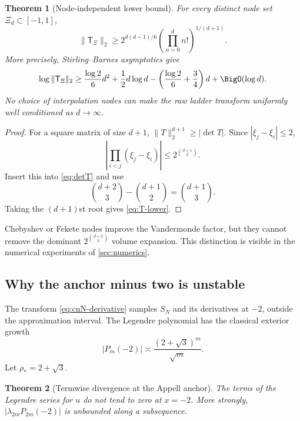 \documentclass[11pt,oneside]{article}
\newtheorem{theorem}{Theorem}[section]
\theoremstyle{definition}
\theoremstyle{remark}
\newcommand{\rhozero}{\rho_{\!*}}
\begin{document}
\begin{theorem}[Node-independent lower bound]
\label{thm:node-independent-instability}
For every distinct node set $\Xi_d\subset[-1,1]$,
\begin{equation}
 \|\mathsf T_\Xi\|_2
 \ge
 2^{d(d-1)/6}
 \left(\prod_{n=0}^{d}n!\right)^{1/(d+1)}.
 \label{eq:T-lower}
\end{equation}
More precisely, Stirling--Barnes asymptotics give
\begin{equation}
 \log\|\mathsf T_\Xi\|_2
 \ge \frac{\log2}{6}d^2+\frac12d\log d
 -\left(\frac{\log2}{6}+\frac34\right)d+\BigO(\log d).
 \label{eq:T-lower-asymptotic}
\end{equation}
No choice of interpolation nodes can make the raw ladder transform uniformly
well conditioned as $d\to\infty$.
\end{theorem}

\begin{proof}
For a square matrix of size $d+1$,
$\|T\|_2^{d+1}\ge|\det T|$.  Since
$|\xi_j-\xi_i|\le2$,
\[
 \left|\prod_{i<j}(\xi_j-\xi_i)\right|
 \le2^{\binom{d+1}{2}}.
\]
Insert this into \eqref{eq:detT} and use
\[
 \binom{d+2}{3}-\binom{d+1}{2}=\binom{d+1}{3}.
\]
Taking the $(d+1)$st root gives \eqref{eq:T-lower}.
\end{proof}

Chebyshev or Fekete nodes improve the Vandermonde factor, but they cannot
remove the dominant $2^{\binom{d+2}{3}}$ volume expansion.  This distinction
is visible in the numerical experiments of \cref{sec:numerics}.

\subsection{Why the anchor minus two is unstable}
The transform \eqref{eq:cnN-derivative} samples $S_N$ and its derivatives at
$-2$, outside the approximation interval.  The Legendre polynomial has the
classical exterior growth
\begin{equation}
 |P_m(-2)|\asymp\frac{(2+\sqrt3)^m}{\sqrt m}.
 \label{eq:Legendre-minus2-growth}
\end{equation}
Let $\rhozero=2+\sqrt3$.

\begin{theorem}[Termwise divergence at the Appell anchor]
\label{thm:Legendre-anchor-divergence}
The terms of the Legendre series for $u$ do not tend to zero at $x=-2$.
More strongly, $|\lambda_{2m}P_{2m}(-2)|$ is unbounded along a subsequence.
\end{theorem}
\end{document}
